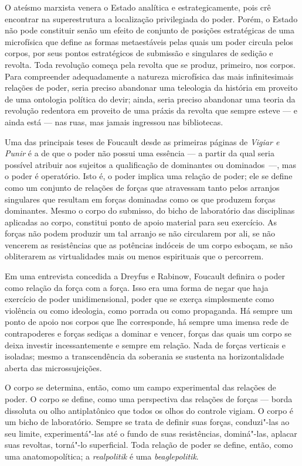O ateísmo marxista venera o Estado analítica e estrategicamente, pois
crê encontrar na superestrutura a localização privilegiada do poder.
Porém, o Estado não pode constituir senão um efeito de conjunto de
posições estratégicas de uma microfísica que define as formas
metaestáveis pelas quais um poder circula pelos corpos, por seus pontos
estratégicos de submissão e singulares de sedição e revolta. Toda
revolução começa pela revolta que se produz, primeiro, nos corpos. Para
compreender adequadamente a natureza microfísica das mais infinitesimais
relações de poder, seria preciso abandonar uma teleologia da história em
proveito de uma ontologia política do devir; ainda, seria preciso
abandonar uma teoria da revolução redentora em proveito de uma práxis da
revolta que sempre esteve --- e ainda está --- nas ruas, mas jamais
ingressou nas bibliotecas.

Uma das principais teses de Foucault desde as primeiras páginas de
\emph{Vigiar e Punir} é a de que o poder não possui uma essência --- a
partir da qual seria possível atribuir aos sujeitos a qualificação de
dominantes ou dominados~---, mas o poder é operatório. Isto é, o poder
implica uma relação de poder; ele se define como um conjunto de relações
de forças que atravessam tanto pelos arranjos singulares que resultam em
forças dominadas como os que produzem forças dominantes. Mesmo o corpo
do submisso, do bicho de laboratório das disciplinas aplicadas ao corpo,
constitui ponto de apoio material para seu exercício. As forças não
podem produzir um tal arranjo se não circularem por ali, se não vencerem
as resistências que as potências indóceis de um corpo esboçam, se não
obliterarem as virtualidades mais ou menos espirituais que o percorrem.

Em uma entrevista concedida a Dreyfus e Rabinow, Foucault definira o
poder como relação da força com a força. Isso era uma forma de negar que
haja exercício de poder unidimensional, poder que se exerça simplesmente
como violência ou como ideologia, como porrada ou como propaganda. Há
sempre um ponto de apoio nos corpos que lhe corresponde, há sempre uma
imensa rede de contrapoderes e forças sediças a dominar e vencer, forças
das quais um corpo se deixa investir incessantemente e sempre em
relação. Nada de forças verticais e isoladas; mesmo a transcendência da
soberania se sustenta na horizontalidade aberta das microssujeições.

O corpo se determina, então, como um campo experimental das relações de
poder. O corpo se define, como uma perspectiva das relações de forças ---
borda dissoluta ou olho antiplatônico que todos os olhos do controle
vigiam. O corpo é um bicho de laboratório. Sempre se trata de definir
suas forças, conduzi"-las ao seu limite, experimentá"-las até o fundo de
suas resistências, dominá"-las, aplacar suas revoltas, torná"-lo
superficial. Toda relação de poder se define, então, como uma
anatomopolítica; a \emph{realpolitik }é uma \emph{beaglepolitik}.

